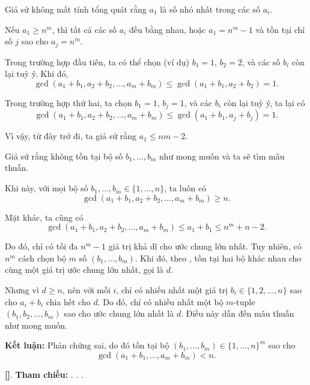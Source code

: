 \documentclass[../2015-n-s.tex]{subfiles}
\begin{document}
\begin{soln}
	
	Giả sử không mất tính tổng quát rằng \(a_1\) là số nhỏ nhất trong các số \(a_i\).
	
	Nếu \(a_1 \ge n^m\), thì tất cả các số \(a_i\) đều bằng nhau,
	hoặc \(a_1 = n^m - 1\) và tồn tại chỉ số \(j\) sao cho \(a_j = n^m\).

	Trong trường hợp đầu tiên, ta có thể chọn (ví dụ) \(b_1 = 1\), \(b_2 = 2\), và các số \(b_i\) còn lại tuỳ ý. Khi đó,
	\[
		\gcd(a_1 + b_1, a_2 + b_2, \ldots, a_m + b_m) \le \gcd(a_1 + b_1, a_2 + b_2) = 1.
	\]
	
	Trong trường hợp thứ hai, ta chọn \(b_1 = 1\), \(b_j = 1\), và các \(b_i\) còn lại tuỳ ý, ta lại có
	\[
		\gcd(a_1 + b_1, a_2 + b_2, \ldots, a_m + b_m) \le \gcd(a_1 + b_1, a_j + b_j) = 1.
	\]
	
	Vì vậy, từ đây trở đi, ta giả sử rằng \(a_1 \le nm - 2\).
	
	Giả sử rằng không tồn tại bộ số \(b_1, \ldots, b_m\) như mong muốn và ta sẽ tìm mâu thuẫn.

	Khi này, với mọi bộ số \(b_1, \ldots, b_m \in \{1, \ldots, n\}\), ta luôn có
	\[
		\gcd(a_1 + b_1, a_2 + b_2, \ldots, a_m + b_m) \ge n.
	\]
	
	Mặt khác, ta cũng có
	\[
		\gcd(a_1 + b_1, a_2 + b_2, \ldots, a_m + b_m) \le a_1 + b_1 \le n^m + n - 2.
	\]
	
	Do đó, chỉ có tối đa \(n^m - 1\) giá trị khả dĩ cho ước chung lớn nhất. Tuy nhiên, có \(n^m\) cách chọn bộ \(m\) số \((b_1, \ldots, b_m)\).
	Khi đó, theo , tồn tại hai bộ khác nhau cho cùng một giá trị ước chung lớn nhất, gọi là \(d\).
	
	Nhưng vì \(d \ge n\), nên với mỗi \(i\), chỉ có nhiều nhất một giá trị \(b_i \in \{1, 2, \ldots, n\}\) sao cho \(a_i + b_i\) chia hết cho \(d\).
	Do đó, chỉ có nhiều nhất một bộ \(m\)-tuple \((b_1, b_2, \ldots, b_m)\) sao cho ước chung lớn nhất là \(d\). Điều này dẫn đến mâu thuẫn như mong muốn.

	\textbf{Kết luận:} Phản chứng sai, do đó tồn tại bộ \( (b_1, \dots, b_m) \in \{1, \dots, n\}^m \) sao cho
	\[
		\gcd(a_1 + b_1, \dots, a_m + b_m) < n.
	\]

	\vspace{1em}
	\textbf{[]}.
	\textbf{Tham chiếu:} . . .
\end{soln}

\end{document}
